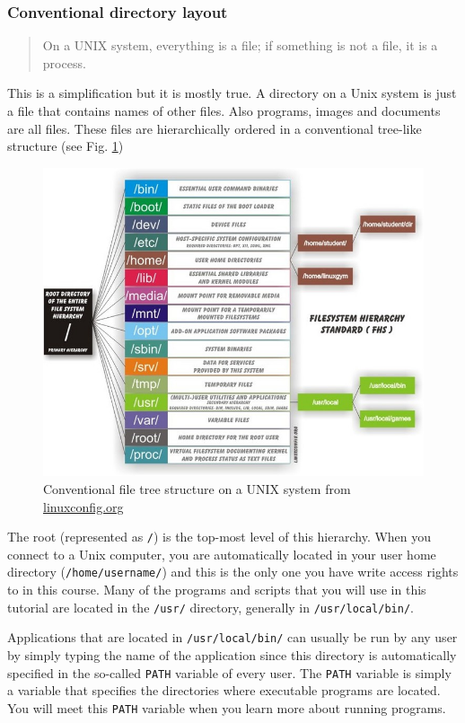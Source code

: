 \documentclass[11pt]{article}
\begin{document}
\subsubsection{Conventional directory layout}
\label{sec-2-1-1}


\begin{quote}
On a UNIX system, everything is a file; if something is not a file, it is a process.
\end{quote}

This is a simplification but it is mostly true. A directory on a Unix
system is just a file that contains names of other files. Also
programs, images and documents are all files. These files are
hierarchically ordered in a conventional tree-like structure (see
Fig. \ref{fig:linuxfiletree})


\begin{figure}[htb]
\centering
\includegraphics[width=12cm]{linuxfiletree.jpg}
\caption{\label{fig:linuxfiletree}Conventional file tree structure on a UNIX system from \href{http://linuxconfig.org/filesystem-basics}{linuxconfig.org}}
\end{figure}


The root (represented as \texttt{/}) is the top-most level of this hierarchy.
When you connect to a Unix computer, you are automatically located in
your user home directory (\texttt{/home/username/}) and this is the only one
you have write access rights to in this course. Many of the programs and
scripts that you will use in this tutorial are located in the \texttt{/usr/}
directory, generally in \texttt{/usr/local/bin/}. 

Applications that are located in \texttt{/usr/local/bin/} can usually be run by any
user by simply typing the name of the application since this directory is automatically specified in the so-called
\texttt{PATH} variable of every user. The \texttt{PATH} variable is simply a
variable that specifies the directories where executable programs are
located. You will meet this \texttt{PATH} variable when you learn more about
running programs.
\end{document}
